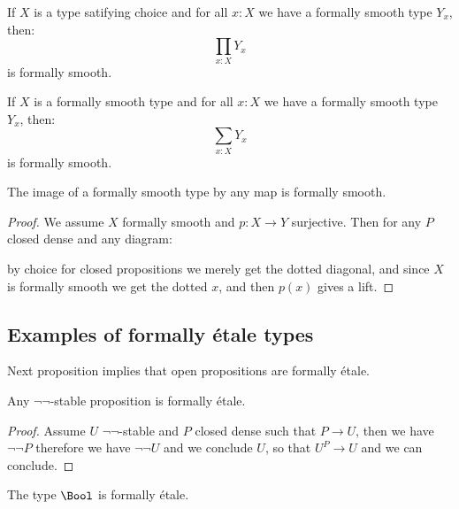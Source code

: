 \begin{lemma}
If $X$ is a type satifying choice and for all $x:X$ we have a formally smooth type $Y_x$, then:
\[\prod_{x:X}Y_x\]
is formally smooth.
\end{lemma}

\begin{lemma}
\label{smooth-sigma-closed}
If $X$ is a formally smooth type and for all $x:X$ we have a formally smooth type $Y_x$, then:
\[\sum_{x:X}Y_x\]
is formally smooth.
\end{lemma}

\begin{proposition}
\label{smoothSurjective}
The image of a formally smooth type by any map is formally smooth.
\end{proposition}

\begin{proof}
We assume $X$ formally smooth and $p:X\to Y$ surjective. Then for any $P$ closed dense and any diagram:
 \begin{center}
    \end{center} 
    by choice for closed propositions we merely get the dotted diagonal, and since $X$ is formally smooth we get the dotted $x$, and then $p(x)$ gives a lift.
\end{proof}



\subsection{Examples of formally étale types}

Next proposition implies that open propositions are formally étale.

\begin{proposition}\label{not-not-stable-prop-etale}
  Any $\neg\neg$-stable proposition is formally étale.
\end{proposition}

\begin{proof}
  Assume $U$ $\neg\neg$-stable and $P$ closed dense such that $P\to U$, then we have $\neg\neg P$ therefore we have $\neg\neg U$ and we conclude $U$, so that $U^P\to U$ and we can conclude.
\end{proof}

\begin{proposition}\label{bool-is-etale}
  The type $\Bool$ is formally étale.
\end{proposition}

